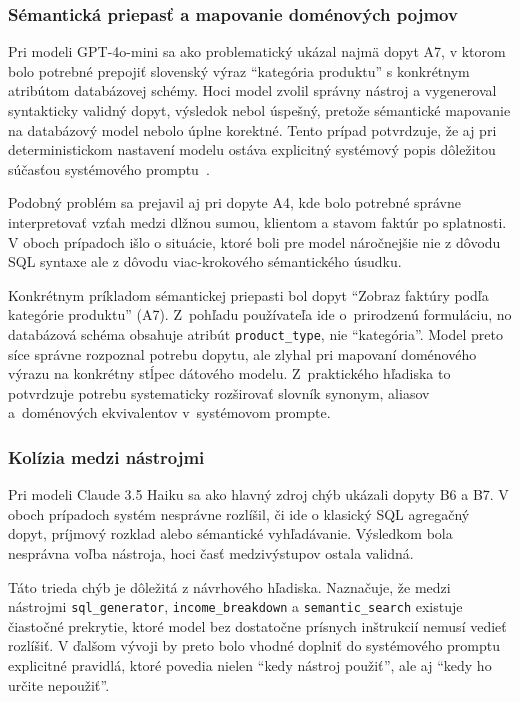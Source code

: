 \subsubsection{Sémantická priepasť a mapovanie doménových pojmov}

Pri modeli GPT-4o-mini sa ako problematický ukázal najmä dopyt A7, v ktorom bolo
potrebné prepojiť slovenský výraz \enquote{kategória produktu} s konkrétnym atribútom
databázovej schémy. Hoci model zvolil správny nástroj a vygeneroval syntakticky
validný dopyt, výsledok nebol úspešný, pretože sémantické mapovanie na
databázový model nebolo úplne korektné. Tento prípad potvrdzuje, že aj pri
deterministickom nastavení modelu ostáva explicitný systémový popis dôležitou
súčasťou systémového promptu~\cite{gao2023texttosql}.

Podobný problém sa prejavil aj pri dopyte A4, kde bolo potrebné správne interpretovať
vzťah medzi dlžnou sumou, klientom a stavom faktúr po splatnosti. V oboch prípadoch
išlo o situácie, ktoré boli pre model náročnejšie nie z dôvodu SQL syntaxe ale z
dôvodu viac-krokového sémantického úsudku.

Konkrétnym príkladom sémantickej priepasti bol dopyt \enquote{Zobraz faktúry podľa kategórie produktu}
(A7). Z~pohľadu používateľa ide o~prirodzenú formuláciu, no databázová schéma obsahuje
atribút \texttt{product\_type}, nie \enquote{kategória}. Model preto síce správne
rozpoznal potrebu dopytu, ale zlyhal pri mapovaní doménového výrazu na konkrétny
stĺpec dátového modelu. Z~praktického hľadiska to potvrdzuje potrebu systematicky
rozširovať slovník synonym, aliasov a~doménových ekvivalentov v~systémovom
prompte.

\subsubsection{Kolízia medzi nástrojmi}

Pri modeli Claude 3.5 Haiku sa ako hlavný zdroj chýb ukázali dopyty B6 a B7. V
oboch prípadoch systém nesprávne rozlíšil, či ide o klasický SQL agregačný dopyt,
príjmový rozklad alebo sémantické vyhľadávanie. Výsledkom bola nesprávna voľba nástroja,
hoci časť medzivýstupov ostala validná.

Táto trieda chýb je dôležitá z návrhového hľadiska. Naznačuje, že medzi
nástrojmi \texttt{sql\_generator}, \texttt{income\_breakdown} a \texttt{semantic\_search}
existuje čiastočné prekrytie, ktoré model bez dostatočne prísnych inštrukcií nemusí
vedieť rozlíšiť. V ďalšom vývoji by preto bolo vhodné doplniť do systémového
promptu explicitné pravidlá, ktoré povedia nielen \enquote{kedy nástroj použiť}, ale
aj \enquote{kedy ho určite nepoužiť}.

